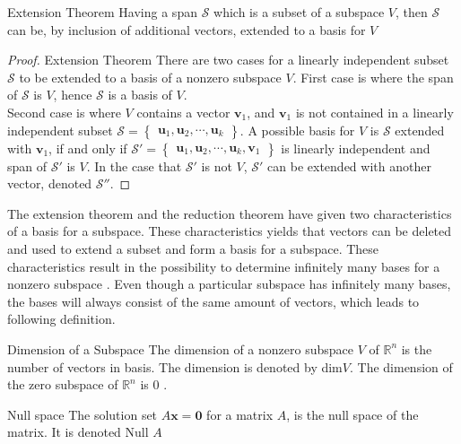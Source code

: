 \begin{theorem}{Extension Theorem}
Having a span $\mathcal{S}$ which is a subset of a subspace $V$, then $\mathcal{S}$ can be, by inclusion of additional vectors, extended to a basis for $V$
\end{theorem}

\begin{proof}{Extension Theorem}
There are two cases for a linearly independent subset $\mathcal{S}$ to be extended to a basis of a nonzero subspace $V$.
First case is where the span of $\mathcal{S}$ is $V$, hence $\mathcal{S}$ is a basis of $V$.\\
Second case is where $V$ contains a vector $\textbf{v}_1$, and $\textbf{v}_1$ is not contained in a linearly independent subset $\mathcal{S}=
\begin{Bmatrix} \textbf{u}_1,\textbf{u}_2,\cdots,\textbf{u}_k \end{Bmatrix} 
 $. A possible basis for $V$ is $\mathcal{S}$ extended with $\textbf{v}_1$, if and only if $\mathcal{S'}=\begin{Bmatrix} \textbf{u}_1,\textbf{u}_2,\cdots,\textbf{u}_k, \textbf{v}_1 \end{Bmatrix}$ is linearly independent and span of $\mathcal{S'}$ is $V$. In the case that $\mathcal{S'}$ is not $V$, $\mathcal{S'}$ can be extended with another vector, denoted $\mathcal{S''}$. 
\end{proof}

The extension theorem and the reduction theorem have given two characteristics of a basis for a subspace. These characteristics yields that vectors can be deleted and used to extend a subset and form a basis for a subspace. These characteristics result in the possibility to determine infinitely many bases for a nonzero subspace . Even though a particular subspace has infinitely many bases, the bases will always consist of the same amount of vectors, which leads to following definition.

\begin{definition}{Dimension of a Subspace}
The dimension of a nonzero subspace $V$ of $\mathbb{R}^n$ is the number of vectors in  basis. The dimension is denoted by dim$V$. The dimension of the zero subspace of $\mathbb{R}^n$ is 0 \cite[246]{LiAl}.
\end{definition}

\begin{definition}{Null space}
The solution set $A\textbf{x}=\textbf{0}$ for a matrix $A$, is the null space of the matrix. It is denoted Null $A$
\end{definition}


